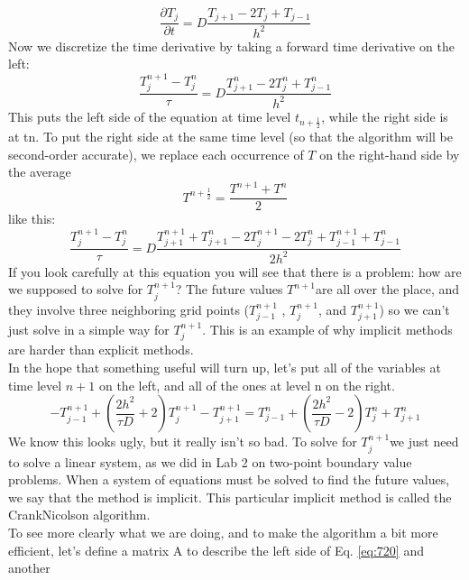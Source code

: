 \begin{equation}\label{eq:716}
\frac{\partial T_{j}}{\partial t}=D \frac{T_{j+1}-2 T_{j}+T_{j-1}}{h^{2}}
\end{equation}
Now we discretize the time derivative by taking a forward time derivative on the
left:
\begin{equation}\label{eq:717}
\frac{T_{j}^{n+1}-T_{j}^{n}}{\tau}=D \frac{T_{j+1}^{n}-2 T_{j}^{n}+T_{j-1}^{n}}{h^{2}}
\end{equation}
This puts the left side of the equation at time level $t_{n+\frac{1}{2}}$, while the right side is
at tn. To put the right side at the same time level (so that the algorithm will be
second-order accurate), we replace each occurrence of $T$ on the right-hand side
by the average
\begin{equation}\label{eq:718}
T^{n+\frac{1}{2}}=\frac{T^{n+1}+T^{n}}{2}
\end{equation}
like this:
\begin{equation}\label{eq:719}
\frac{T_{j}^{n+1}-T_{j}^{n}}{\tau}=D \frac{T_{j+1}^{n+1}+T_{j+1}^{n}-2 T_{j}^{n+1}-2 T_{j}^{n}+T_{j-1}^{n+1}+T_{j-1}^{n}}{2 h^{2}}
\end{equation}
If you look carefully at this equation you will see that there is a problem: how are
we supposed to solve for $T^{n+1}_j$? The future values $T^{n+1}$are all over the place, and
they involve three neighboring grid points ($T^{n+1}_{j-1}$ , $T^{n+1}_{j}$, and $T^{n+1}_{j+1}$) so we can’t just
solve in a simple way for $T^{n+1}_j$. This is an example of why implicit methods are
harder than explicit methods. \\ 
In the hope that something useful will turn up, let\rq s put all of the variables at
time level $n +1$ on the left, and all of the ones at level n on the right.
\begin{equation}\label{eq:720}
-T_{j-1}^{n+1}+\left(\frac{2 h^{2}}{\tau D}+2\right) T_{j}^{n+1}-T_{j+1}^{n+1}=T_{j-1}^{n}+\left(\frac{2 h^{2}}{\tau D}-2\right) T_{j}^{n}+T_{j+1}^{n}
\end{equation}
We know this looks ugly, but it really isn\rq t so bad. To solve for $T^{n+1}_j$we just need to
solve a linear system, as we did in Lab 2 on two-point boundary value problems.
When a system of equations must be solved to find the future values, we say
that the method is implicit. This particular implicit method is called the CrankNicolson algorithm. \\ 
To see more clearly what we are doing, and to make the algorithm a bit more
efficient, let\rq s define a matrix A to describe the left side of Eq. \eqref{eq:720} and another
